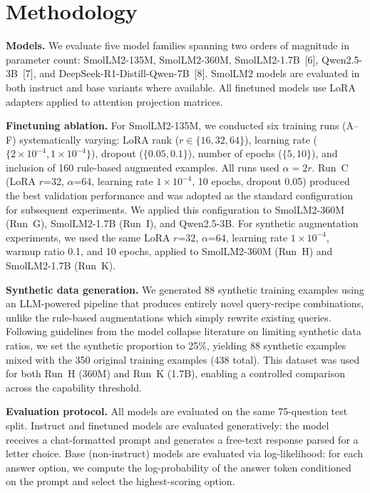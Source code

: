 \documentclass{article}
\begin{document}
\section{Methodology}

\textbf{Models.} We evaluate five model families spanning two orders of magnitude in parameter count: SmolLM2-135M, SmolLM2-360M, SmolLM2-1.7B~[6], Qwen2.5-3B~[7], and DeepSeek-R1-Distill-Qwen-7B~[8]. SmolLM2 models are evaluated in both instruct and base variants where available. All finetuned models use LoRA adapters applied to attention projection matrices.

\textbf{Finetuning ablation.} For SmolLM2-135M, we conducted six training runs (A--F) systematically varying: LoRA rank ($r \in \{16, 32, 64\}$), learning rate ($\{2 \times 10^{-4}, 1 \times 10^{-4}\}$), dropout ($\{0.05, 0.1\}$), number of epochs ($\{5, 10\}$), and inclusion of 160 rule-based augmented examples. All runs used $\alpha = 2r$. Run~C (LoRA $r$=32, $\alpha$=64, learning rate $1 \times 10^{-4}$, 10 epochs, dropout 0.05) produced the best validation performance and was adopted as the standard configuration for subsequent experiments. We applied this configuration to SmolLM2-360M (Run~G), SmolLM2-1.7B (Run~I), and Qwen2.5-3B. For synthetic augmentation experiments, we used the same LoRA $r$=32, $\alpha$=64, learning rate $1 \times 10^{-4}$, warmup ratio 0.1, and 10 epochs, applied to SmolLM2-360M (Run~H) and SmolLM2-1.7B (Run~K).

\textbf{Synthetic data generation.} We generated 88 synthetic training examples using an LLM-powered pipeline that produces entirely novel query-recipe combinations, unlike the rule-based augmentations which simply rewrite existing queries. Following guidelines from the model collapse literature on limiting synthetic data ratios, we set the synthetic proportion to 25\%, yielding 88 synthetic examples mixed with the 350 original training examples (438 total). This dataset was used for both Run~H (360M) and Run~K (1.7B), enabling a controlled comparison across the capability threshold.

\textbf{Evaluation protocol.} All models are evaluated on the same 75-question test split. Instruct and finetuned models are evaluated generatively: the model receives a chat-formatted prompt and generates a free-text response parsed for a letter choice. Base (non-instruct) models are evaluated via log-likelihood: for each answer option, we compute the log-probability of the answer token conditioned on the prompt and select the highest-scoring option.
\end{document}
